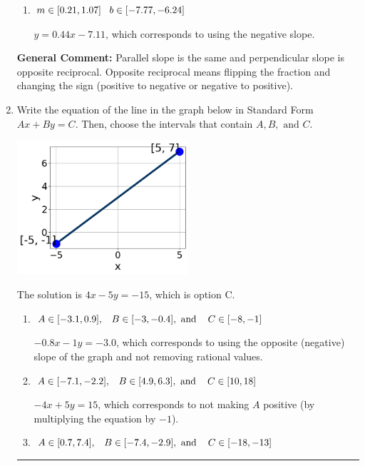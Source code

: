 \documentclass{extbook}[14pt]
\newcommand{\litem}[1]{\item #1

\rule{\textwidth}{0.4pt}}
\begin{document}
\begin{enumerate}
{\begin{enumerate}[label=\Alph*.]
* $y = -0.44x - 8.89$, which is the correct option.
\item \( m \in [0.21, 1.07] \hspace*{3mm} b \in [-7.77, -6.24] \)

 $y = 0.44x - 7.11$, which corresponds to using the negative slope.
\end{enumerate}

\textbf{General Comment:} Parallel slope is the same and perpendicular slope is opposite reciprocal. Opposite reciprocal means flipping the fraction and changing the sign (positive to negative or negative to positive).
}
\litem{
Write the equation of the line in the graph below in Standard Form $Ax+By=C$. Then, choose the intervals that contain $A, B, \text{ and } C$.

\begin{center}
    \includegraphics[width=0.5\textwidth]{../Figures/linearGraphToStandardB.png}
\end{center}


The solution is \( 4x - 5y = -15 \), which is option C.\begin{enumerate}[label=\Alph*.]
\item \( A \in [-3.1, 0.9], \hspace{3mm} B \in [-3, -0.4], \text{ and } \hspace{3mm} C \in [-8, -1] \)

 $-0.8x - 1y = -3.0$, which corresponds to using the opposite (negative) slope of the graph and not removing rational values.
\item \( A \in [-7.1, -2.2], \hspace{3mm} B \in [4.9, 6.3], \text{ and } \hspace{3mm} C \in [10, 18] \)

 $-4x + 5y = 15$, which corresponds to not making $A$ positive (by multiplying the equation by $-1$).
\item \( A \in [0.7, 7.4], \hspace{3mm} B \in [-7.4, -2.9], \text{ and } \hspace{3mm} C \in [-18, -13] \)


\end{enumerate}}
\end{enumerate}
\end{document}

